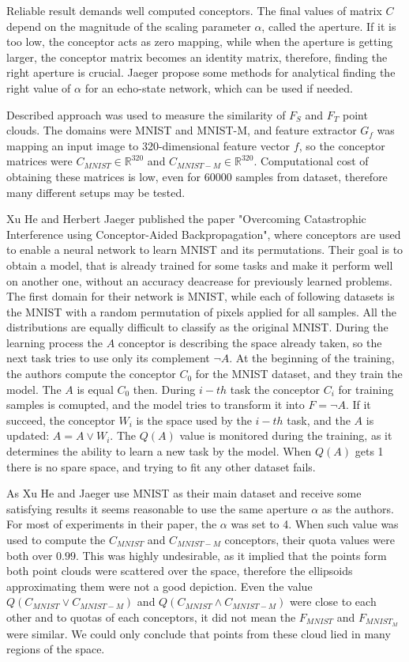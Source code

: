 \documentclass{article}
\begin{document}
\par
Reliable result demands well computed conceptors. The final values of matrix $C$ depend on the magnitude of the scaling parameter $\alpha$, called the aperture. If it is too low, the conceptor acts as zero mapping, while when the aperture is getting larger, the conceptor matrix becomes an identity matrix, therefore, finding the right aperture is crucial. Jaeger propose some methods for analytical finding the right value of $\alpha$ for an echo-state network, which can be used if needed.
\par
Described approach was used to measure the similarity of $F_{S}$ and $F_{T}$ point clouds. The domains were MNIST and MNIST-M, and feature extractor $G_{f}$ was mapping an input image to 320-dimensional feature vector $f$, so the conceptor matrices were $C_{MNIST} \in \mathbb{R}^{320}$ and $C_{MNIST-M} \in \mathbb{R}^{320}$. Computational cost of obtaining these matrices is low, even for 60000 samples from dataset, therefore many different setups may be tested.
\par
Xu He and Herbert Jaeger published the paper "Overcoming Catastrophic Interference using Conceptor-Aided Backpropagation", where conceptors are used to enable a neural network to learn MNIST and its permutations. Their goal is to obtain a model, that is already trained for some tasks and make it perform well on another one, without an accuracy deacrease for previously learned problems. The first domain for their network is MNIST, while each of following datasets is the MNIST with a random permutation of pixels applied for all samples. All the distributions are equally difficult to classify as the original MNIST. During the learning process the $A$ conceptor is describing the space already taken, so the next task tries to use only its complement $\neg A$. At the beginning of the training, the authors compute the conceptor $C_{0}$ for the MNIST dataset, and they train the model. The $A$ is equal $C_{0}$ then. During $i-th$ task the conceptor $C_i$ for training samples is comupted, and the model tries to transform it into $F = \neg A$. If it succeed, the conceptor $W_{i}$ is the space used by the $i-th$ task, and the $A$ is updated: $A = A \vee W_{i}$. The $Q(A)$ value is monitored during the training, as it determines the ability to learn a new task by the model. When $Q(A)$ gets 1 there is no spare space, and trying to fit any other dataset fails. 
\par
As Xu He and Jaeger use MNIST as their main dataset and receive some satisfying results it seems reasonable to use the same aperture $\alpha$ as the authors. For most of experiments in their paper, the $\alpha$ was set to 4. When such value was used to compute the $C_{MNIST}$ and $C_{MNIST-M}$ conceptors, their quota values were both over $0.99$. This was highly undesirable, as it implied that the points form both point clouds were scattered over the space, therefore the ellipsoids approximating them were not a good depiction. Even the value $Q(C_{MNIST} \vee C_{MNIST-M} )$ and $Q(C_{MNIST} \wedge C_{MNIST-M} )$ were close to each other and to quotas of each conceptors, it did not mean the $F_{MNIST}$ and $F_{MNIST_M}$ were similar. We could only conclude that points from these cloud lied in many regions of the space. 
\end{document}

